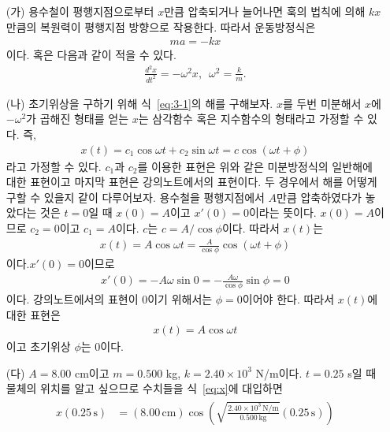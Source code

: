 \documentclass[floatfix,nofootinbib,superscriptaddress,fleqn]{revtex4-2}
\begin{document}
 \begin{itemize}
  \item[(가)] 
  용수철이 평행지점으로부터 $x$만큼 압축되거나 늘어나면 훅의 법칙에 의해 $kx$만큼의
  복원력이 평행지점 방향으로 작용한다. 따라서 운동방정식은
  \begin{align}
    ma = -kx
  \end{align} 
  이다. 혹은 다음과 같이 적을 수 있다.
  \begin{align}\label{eq:3-1}
    \frac{d^2x}{dt^2} = -\omega^2x,\,\,\,\omega^2 = \frac{k}{m}.
  \end{align}
  \item[(나)] 
  초기위상을 구하기 위해 식~\eqref{eq:3-1}의 해를 구해보자. $x$를 두번 미분해서
  $x$에 $-\omega^2$가 곱해진 형태를 얻는 $x$는 삼각함수 혹은 지수함수의 형태라고
  가정할 수 있다. 즉,
  \begin{align}
    x(t) = c_1\cos\omega t + c_2\sin\omega t
    =c\cos(\omega t + \phi)
  \end{align}
  라고 가정할 수 있다. $c_1$과 $c_2$를 이용한 표현은 위와 같은 미분방정식의 일반해에
  대한 표현이고 마지막 표현은 강의노트에서의 표현이다. 두 경우에서 해를 어떻게 구할 수
  있을지 같이 다루어보자. 
  용수철을 평행지점에서 $A$만큼 압축하였다가 놓았다는 것은
  $t=0$일 때 $x(0)=A$이고 $x'(0)=0$이라는 뜻이다. 
  $x(0)=A$이므로 $c_2=0$이고 $c_1=A$이다. $c$는 $c= A/\cos\phi$이다.
  따라서 $x(t)$는
  \begin{align}
    x(t) = A\cos\omega t = \frac{A}{\cos\phi}\cos(\omega t + \phi)
  \end{align}
  이다.$x'(0)=0$이므로
  \begin{align}
    x'(0)=-A\omega\sin 0 = -\frac{A\omega}{\cos\phi}\sin\phi = 0
  \end{align}
  이다. 강의노트에서의 표현이 $0$이기 위해서는 $\phi=0$이어야 한다. 따라서 $x(t)$에
  대한 표현은
  \begin{align}\label{eq:x}
    x(t) = A\cos\omega t
  \end{align}
  이고 초기위상 $\phi$는 $0$이다.
  \item[(다)] 
  $A=8.00$ cm이고 $m=0.500$ kg, $k=2.40\times 10^3$ N/m이다. 
  $t=0.25$ s일 때 물체의 위치를 알고 싶으므로 수치들을
  식~\eqref{eq:x}에 대입하면
  \begin{align}
    \begin{split}
      x(0.25\,\mathrm{s}) &= (8.00\,\mathrm{cm})
      \cos\left(
        \sqrt{\frac{2.40\times 10^3\,\mathrm{N/m}}{0.500\,\mathrm{kg}}}
        (0.25\,\mathrm{s})\right) \\

\end{split}
\end{align}
\end{itemize}
\end{document}
